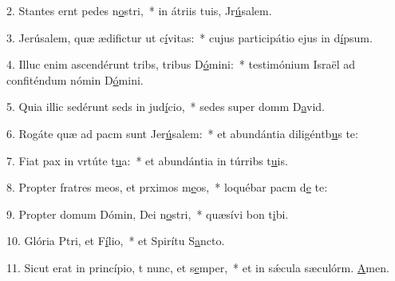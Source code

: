 2. Stantes ernt pedes n\uline{o}stri,~* in átriis tuis, Jr\uline{ú}salem.\par 
3. Jerúsalem, quæ ædifictur ut c\uline{í}vitas:~* cujus participátio ejus in d\uline{í}psum.\par 
4. Illuc enim ascendérunt tribs, tribus D\uline{ó}mini:~* testimónium Israël ad confiténdum nómin D\uline{ó}mini.\par 
5. Quia illic sedérunt seds in jud\uline{í}cio,~* sedes super domm D\uline{a}vid.\par 
6. Rogáte quæ ad pacm sunt Jer\uline{ú}salem:~* et abundántia diligéntb\uline{u}s te:\par 
7. Fiat pax in vrtúte t\uline{u}a:~* et abundántia in túrribs t\uline{u}is.\par 
8. Propter fratres meos, et prximos m\uline{e}os,~* loquébar pacm d\uline{e} te:\par 
9. Propter domum Dómin, Dei n\uline{o}stri,~* quæsívi bon t\uline{i}bi.\par 
10. Glória Ptri, et F\uline{í}lio,~* et Spirítu S\uline{a}ncto.\par 
11. Sicut erat in princípio, t nunc, et s\uline{e}mper,~* et in sǽcula sæculórm. \uline{A}men.\par 

